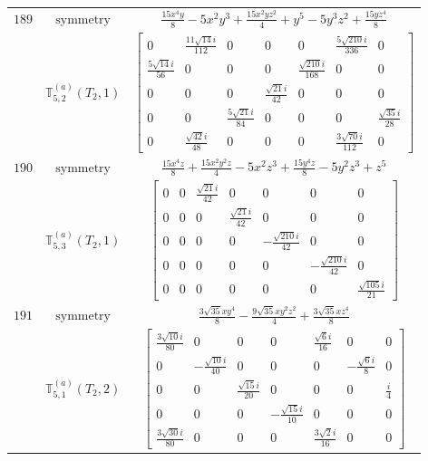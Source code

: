 \documentclass[fleqn,8pt,landscape]{jsarticle}
\begin{document}
\begin{longtable}{ccc}
$ 189 $ & $ \text{symmetry} $ & $ \frac{15 x^{4} y}{8} - 5 x^{2} y^{3} + \frac{15 x^{2} y z^{2}}{4} + y^{5} - 5 y^{3} z^{2} + \frac{15 y z^{4}}{8} $ \\
$  $ & $ \mathbb{T}_{5,2}^{(a)}(T_{2},1) $ & $ \begin{bmatrix} 0 & \frac{11 \sqrt{14} i}{112} & 0 & 0 & 0 & \frac{5 \sqrt{210} i}{336} & 0 \\ \frac{5 \sqrt{14} i}{56} & 0 & 0 & 0 & \frac{\sqrt{210} i}{168} & 0 & 0 \\ 0 & 0 & 0 & \frac{\sqrt{21} i}{42} & 0 & 0 & 0 \\ 0 & 0 & \frac{5 \sqrt{21} i}{84} & 0 & 0 & 0 & \frac{\sqrt{35} i}{28} \\ 0 & \frac{\sqrt{42} i}{48} & 0 & 0 & 0 & \frac{3 \sqrt{70} i}{112} & 0 \end{bmatrix} $ \\ \hline
$ 190 $ & $ \text{symmetry} $ & $ \frac{15 x^{4} z}{8} + \frac{15 x^{2} y^{2} z}{4} - 5 x^{2} z^{3} + \frac{15 y^{4} z}{8} - 5 y^{2} z^{3} + z^{5} $ \\
$  $ & $ \mathbb{T}_{5,3}^{(a)}(T_{2},1) $ & $ \begin{bmatrix} 0 & 0 & \frac{\sqrt{21} i}{42} & 0 & 0 & 0 & 0 \\ 0 & 0 & 0 & \frac{\sqrt{21} i}{42} & 0 & 0 & 0 \\ 0 & 0 & 0 & 0 & - \frac{\sqrt{210} i}{42} & 0 & 0 \\ 0 & 0 & 0 & 0 & 0 & - \frac{\sqrt{210} i}{42} & 0 \\ 0 & 0 & 0 & 0 & 0 & 0 & \frac{\sqrt{105} i}{21} \end{bmatrix} $ \\ \hline
$ 191 $ & $ \text{symmetry} $ & $ \frac{3 \sqrt{35} x y^{4}}{8} - \frac{9 \sqrt{35} x y^{2} z^{2}}{4} + \frac{3 \sqrt{35} x z^{4}}{8} $ \\
$  $ & $ \mathbb{T}_{5,1}^{(a)}(T_{2},2) $ & $ \begin{bmatrix} \frac{3 \sqrt{10} i}{80} & 0 & 0 & 0 & \frac{\sqrt{6} i}{16} & 0 & 0 \\ 0 & - \frac{\sqrt{10} i}{40} & 0 & 0 & 0 & - \frac{\sqrt{6} i}{8} & 0 \\ 0 & 0 & \frac{\sqrt{15} i}{20} & 0 & 0 & 0 & \frac{i}{4} \\ 0 & 0 & 0 & - \frac{\sqrt{15} i}{10} & 0 & 0 & 0 \\ \frac{3 \sqrt{30} i}{80} & 0 & 0 & 0 & \frac{3 \sqrt{2} i}{16} & 0 & 0 \end{bmatrix} $ \\ \hline

\end{longtable}
\end{document}
